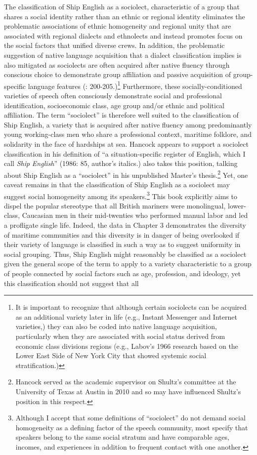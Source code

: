 The classification of Ship English as a sociolect, characteristic of a group that shares a social identity rather than an ethnic or regional identity \citep[122]{Trudgill2003} eliminates the problematic associations of ethnic homogeneity and regional unity that are associated with regional dialects and ethnolects and instead promotes focus on the social factors that unified diverse crews. In addition, the problematic suggestion of native language acquisition that a dialect classification implies is also mitigated as sociolects are often acquired after native fluency through conscious choice to demonstrate group affiliation and passive acquisition of group-specific language features (\citealt{Durrell2004}: 200-205.)\footnote{It is important to recognize that although certain sociolects can be acquired as an additional variety later in life (e.g., Instant Messenger and Internet varieties,) they can also be coded into native language acquisition, particularly when they are associated with social status derived from economic class divisions regions (e.g., Labov’s 1966 research based on the Lower East Side of New York City that showed systemic social stratification.)}  Furthermore, these socially-conditioned varieties of speech often consciously demonstrate social and professional identification, socioeconomic class, age group and/or ethnic and political affiliation. The term “sociolect” is therefore well suited to the classification of Ship English, a variety that is acquired after native fluency among predominantly young working-class men who share a professional context, maritime folklore, and solidarity in the face of hardships at sea. Hancock appears to support a sociolect classification in his definition of “a situation-specific register of English, which I call \textit{Ship} \textit{English}” (1986: 85, author’s italics.) \citet{Schultz2010} also takes this position, talking about Ship English as a “sociolect” in his unpublished Master’s thesis.\footnote{Hancock served as the academic supervisor on Shultz’s committee at the University of Texas at Austin in 2010 and so may have influenced Shultz’s position in this respect.}  Yet, one caveat remains in that the classification of Ship English as a sociolect may suggest social homogeneity among its speakers.\footnote{Although I accept that some definitions of “sociolect” do not demand social homogeneity as a defining factor of the speech community, most specify that speakers belong to the same social stratum and have comparable ages, incomes, and experiences in addition to frequent contact with one another.}  This book explicitly aims to dispel the popular stereotype that all British mariners were monolingual, lower-class, Caucasian men in their mid-twenties who performed manual labor and led a profligate single life. Indeed, the data in Chapter 3 demonstrates the diversity of maritime communities and this diversity is in danger of being overlooked if their variety of language is classified in such a way as to suggest uniformity in social grouping. Thus, Ship English might reasonably be classified as a sociolect given the general scope of the term to apply to a variety characteristic to a group of people connected by social factors such as age, profession, and ideology, yet this classification should not suggest that all 